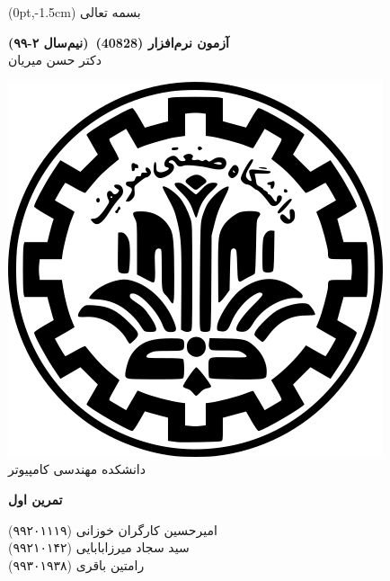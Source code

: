 \documentclass[twoside]{article}
\newcommand{\Institute}{دانشکده مهندسی کامپیوتر}
\newcommand{\Title}{تمرین اول}
\newcommand{\Class}{آزمون نرم‌افزار}
\newcommand{\Semester}{۲-۹۹}
\newcommand{\Instructor}{دکتر حسن میریان}
\newcommand{\ClassCode}{40828}
\begin{document}
	\thispagestyle{plain}
	\begin{textblock*}{\textwidth}(0pt,-1.5cm)
		\centering \small
		بسمه تعالی
	\end{textblock*}
	\begin{minipage}[c]{0.7\textwidth}
		\flushright
		{\Large\bfseries{\Class} (\ClassCode)\ {\scriptsize (نیم‌سال \Semester)}}\\
		{\small \Instructor}
	\end{minipage}
	\hfill
	\begin{minipage}[c]{0.17\textwidth}
		\centering
		\includegraphics[width=.6\textwidth]{sharif-logo}\\[-5pt]
		{\scriptsize \Institute}
	\end{minipage}
	\vspace{2ex}
	\begin{titlebox}
		{\Large{\textbf{\Title}}}\hfill
		\parbox{.4\textwidth}{%
			\vspace{-1.3ex}
			\flushleft
			\small
امیرحسین کارگران خوزانی {\footnotesize (۹۹۲۰۱۱۱۹)}\\
سید سجاد میرزابابایی {\footnotesize (۹۹۲۱۰۱۴۲)}\\
رامتین باقری {\footnotesize (۹۹۳۰۱۹۳۸)}
		}
	\end{titlebox}
\end{document}
